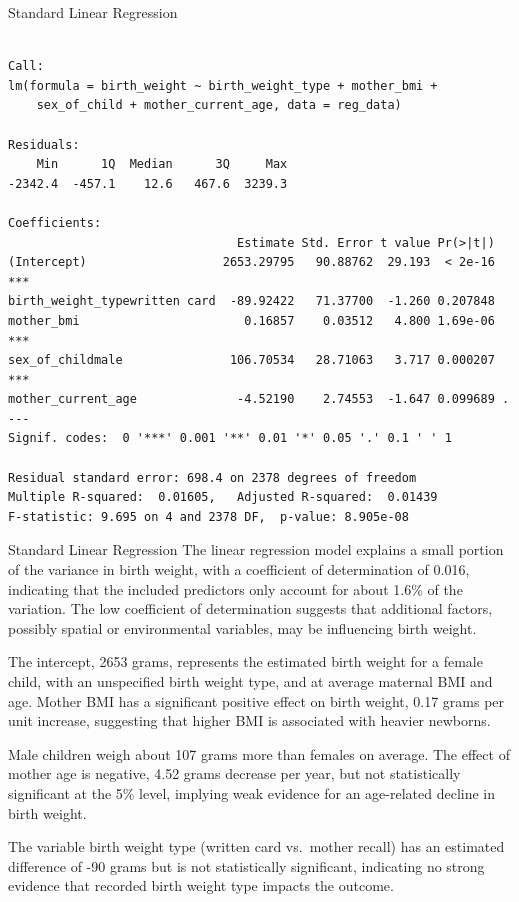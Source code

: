 \documentclass[
  ignorenonframetext,
]{beamer}
\begin{document}
\begin{frame}[fragile]{Standard Linear Regression}
\label{standard-linear-regression}
\begin{verbatim}

Call:
lm(formula = birth_weight ~ birth_weight_type + mother_bmi + 
    sex_of_child + mother_current_age, data = reg_data)

Residuals:
    Min      1Q  Median      3Q     Max 
-2342.4  -457.1    12.6   467.6  3239.3 

Coefficients:
                                Estimate Std. Error t value Pr(>|t|)    
(Intercept)                   2653.29795   90.88762  29.193  < 2e-16 ***
birth_weight_typewritten card  -89.92422   71.37700  -1.260 0.207848    
mother_bmi                       0.16857    0.03512   4.800 1.69e-06 ***
sex_of_childmale               106.70534   28.71063   3.717 0.000207 ***
mother_current_age              -4.52190    2.74553  -1.647 0.099689 .  
---
Signif. codes:  0 '***' 0.001 '**' 0.01 '*' 0.05 '.' 0.1 ' ' 1

Residual standard error: 698.4 on 2378 degrees of freedom
Multiple R-squared:  0.01605,   Adjusted R-squared:  0.01439 
F-statistic: 9.695 on 4 and 2378 DF,  p-value: 8.905e-08
\end{verbatim}
\end{frame}

\begin{frame}{Standard Linear Regression}
\label{standard-linear-regression-1}
The linear regression model explains a small portion of the variance in
birth weight, with a coefficient of determination of 0.016, indicating
that the included predictors only account for about 1.6\% of the
variation. The low coefficient of determination suggests that additional
factors, possibly spatial or environmental variables, may be influencing
birth weight.

The intercept, 2653 grams, represents the estimated birth weight for a
female child, with an unspecified birth weight type, and at average
maternal BMI and age. Mother BMI has a significant positive effect on
birth weight, 0.17 grams per unit increase, suggesting that higher BMI
is associated with heavier newborns.

Male children weigh about 107 grams more than females on average. The
effect of mother age is negative, 4.52 grams decrease per year, but not
statistically significant at the 5\% level, implying weak evidence for
an age-related decline in birth weight.

The variable birth weight type (written card vs.~mother recall) has an
estimated difference of -90 grams but is not statistically significant,
indicating no strong evidence that recorded birth weight type impacts
the outcome.
\end{frame}
\end{document}
